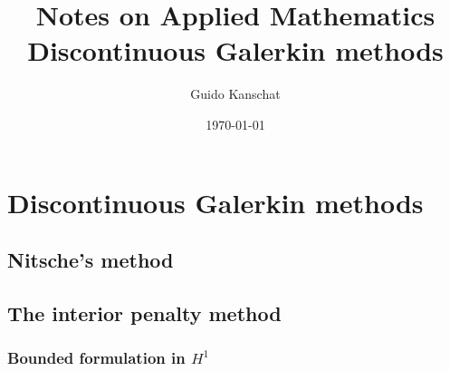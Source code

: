 \documentclass[USenglish,12pt]{report}
\title{\textbf{Notes on Applied Mathematics}
\\[5mm]
{\large Discontinuous Galerkin methods}}
\author{Guido Kanschat}
\date{\today}
\begin{document}
\maketitle

\chapter{Discontinuous Galerkin methods}
\section{Nitsche's method}
\label{sec:nitsches-method}


\section{The interior penalty method}
\label{sec:interior-penalty}

\subsection{Bounded formulation in $H^1$}

\end{document}

